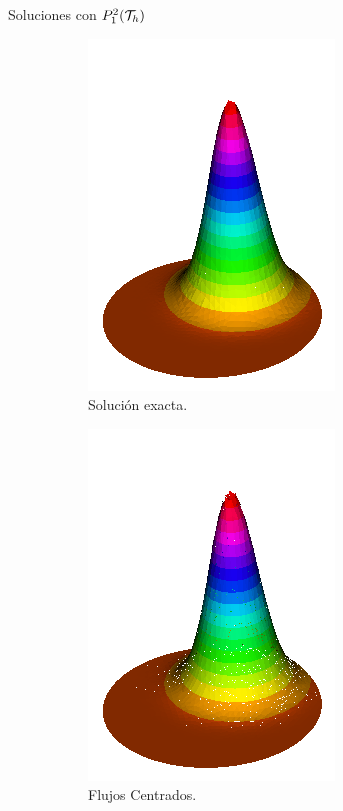 		\begin{frame}{Soluciones con $\relax{P}_1^2(\mathcal{T}_h)$}
		\vspace{-0.2cm}
		\begin{figure}[h!]
			\begin{subfigure}[b]{0.27\textwidth}
				\centering
				\includegraphics[scale=0.22]{img/Conveccion_Reaccion/Recortes/steady_convect_react_exact_n_128.png}
				\caption{Solución exacta.}
			\end{subfigure}
			\begin{subfigure}[b]{0.27\textwidth}
				\centering
				\includegraphics[scale=0.22]{img/Conveccion_Reaccion/Recortes/steady_convect_react_approx_CF_n_128.png}
				\caption{Flujos Centrados.}
			\end{subfigure}
			\begin{subfigure}[b]{0.27\textwidth}

\end{subfigure}
\end{figure}
\end{frame}
